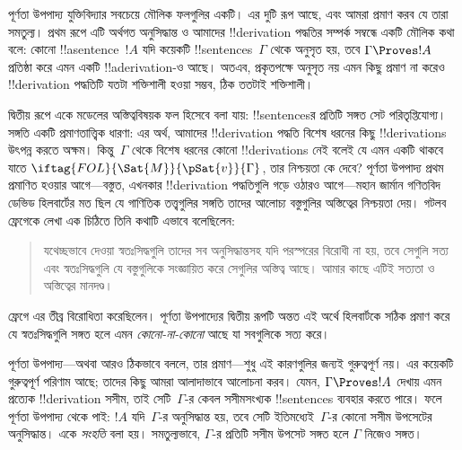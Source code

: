 \documentclass[../../../include/open-logic-section]{subfiles}
\begin{document}
      {}
      {}


পূর্ণতা উপপাদ্য যুক্তিবিদ্যার সবচেয়ে মৌলিক ফলগুলির একটি। এর দুটি রূপ
আছে, এবং আমরা প্রমাণ করব যে তারা সমতুল্য। প্রথম রূপে এটি অর্থগত
অনুসিদ্ধান্ত ও আমাদের !!{derivation} পদ্ধতির সম্পর্ক সম্বন্ধে একটি মৌলিক
কথা বলে: কোনো !!a{sentence}~$!A$ যদি কয়েকটি !!{sentence}s~$\Gamma$ থেকে
অনুসৃত হয়, তবে $\Gamma \Proves !A$ প্রতিষ্ঠা করে এমন একটি
!!a{derivation}-ও আছে। অতএব, প্রকৃতপক্ষে অনুসৃত নয় এমন কিছু প্রমাণ না
করেও !!{derivation} পদ্ধতিটি যতটা শক্তিশালী হওয়া সম্ভব, ঠিক ততটাই
শক্তিশালী।

দ্বিতীয় রূপে একে মডেলের অস্তিত্ববিষয়ক ফল হিসেবে বলা যায়: !!{sentence}sর
প্রতিটি সঙ্গত সেট পরিতৃপ্তিযোগ্য। সঙ্গতি একটি প্রমাণতাত্ত্বিক ধারণা: এর
অর্থ, আমাদের !!{derivation} পদ্ধতি বিশেষ ধরনের কিছু !!{derivation}s
উৎপন্ন করতে অক্ষম। কিন্তু~$\Gamma$ থেকে বিশেষ ধরনের কোনো
!!{derivation}s নেই বলেই যে এমন একটি
থাকবে যাতে $\iftag{FOL}{\Sat{M}}{\pSat{v}}{\Gamma}$, তার নিশ্চয়তা কে
দেবে? পূর্ণতা উপপাদ্য প্রথম প্রমাণিত হওয়ার আগে—বস্তুত, এখনকার
!!{derivation} পদ্ধতিগুলি গড়ে ওঠারও আগে—মহান জার্মান গণিতবিদ ডেভিড
হিলবার্টের মত ছিল যে গাণিতিক তত্ত্বগুলির সঙ্গতি তাদের আলোচ্য বস্তুগুলির
অস্তিত্বের নিশ্চয়তা দেয়। গটলব ফ্রেগেকে লেখা এক চিঠিতে তিনি কথাটি এভাবে
বলেছিলেন:
\begin{quote}
  যথেচ্ছভাবে দেওয়া স্বতঃসিদ্ধগুলি তাদের সব অনুসিদ্ধান্তসহ যদি পরস্পরের
  বিরোধী না হয়, তবে সেগুলি সত্য এবং স্বতঃসিদ্ধগুলি যে বস্তুগুলিকে
  সংজ্ঞায়িত করে সেগুলির অস্তিত্ব আছে। আমার কাছে এটিই সত্যতা ও অস্তিত্বের
  মানদণ্ড।
\end{quote}
ফ্রেগে এর তীব্র বিরোধিতা করেছিলেন। পূর্ণতা উপপাদ্যের দ্বিতীয় রূপটি অন্তত
এই অর্থে হিলবার্টকে সঠিক প্রমাণ করে যে স্বতঃসিদ্ধগুলি সঙ্গত হলে এমন
\emph{কোনো-না-কোনো}  আছে যা
সবগুলিকে সত্য করে।

পূর্ণতা উপপাদ্য—অথবা আরও ঠিকভাবে বললে, তার প্রমাণ—শুধু এই কারণগুলির জন্যই
গুরুত্বপূর্ণ নয়। এর কয়েকটি গুরুত্বপূর্ণ পরিণাম আছে; তাদের কিছু আমরা
আলাদাভাবে আলোচনা করব। যেমন, $\Gamma \Proves !A$ দেখায় এমন প্রত্যেক
!!{derivation} সসীম, তাই সেটি~$\Gamma$-র কেবল সসীমসংখ্যক !!{sentence}s
ব্যবহার করতে পারে। ফলে পূর্ণতা উপপাদ্য থেকে পাই: $!A$ যদি~$\Gamma$-র
অনুসিদ্ধান্ত হয়, তবে সেটি ইতিমধ্যেই~$\Gamma$-র কোনো সসীম উপসেটের
অনুসিদ্ধান্ত। একে \emph{সংহতি} বলা হয়। সমতুল্যভাবে, $\Gamma$-র প্রতিটি
সসীম উপসেট সঙ্গত হলে $\Gamma$ নিজেও সঙ্গত।
\end{document}
